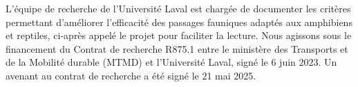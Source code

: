 L'équipe de recherche de l'Université Laval est chargée de documenter les critères permettant d'améliorer l'efficacité des passages fauniques adaptés aux amphibiens et reptiles, ci-après appelé \og le projet \fg{} pour faciliter la lecture. Nous agissons sous le financement du Contrat de recherche R875.1 entre le ministère des Transports et de la Mobilité durable (MTMD) et l'Université Laval, signé le 6 juin 2023. Un avenant au contrat de recherche a été signé le 21 mai 2025.